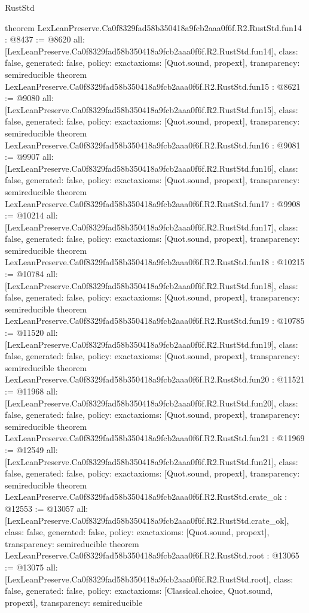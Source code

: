 \begin{lexlean}{RustStd}
\begin{coremodule}
{}
theorem LexLeanPreserve.Ca0f8329fad58b350418a9fcb2aaa0f6f.R2.RustStd.fun14 : @8437 := @8620 {
  all: [LexLeanPreserve.Ca0f8329fad58b350418a9fcb2aaa0f6f.R2.RustStd.fun14],
  class: false,
  generated: false,
  policy: exact{axioms: [Quot.sound, propext]},
  transparency: semireducible
}
theorem LexLeanPreserve.Ca0f8329fad58b350418a9fcb2aaa0f6f.R2.RustStd.fun15 : @8621 := @9080 {
  all: [LexLeanPreserve.Ca0f8329fad58b350418a9fcb2aaa0f6f.R2.RustStd.fun15],
  class: false,
  generated: false,
  policy: exact{axioms: [Quot.sound, propext]},
  transparency: semireducible
}
theorem LexLeanPreserve.Ca0f8329fad58b350418a9fcb2aaa0f6f.R2.RustStd.fun16 : @9081 := @9907 {
  all: [LexLeanPreserve.Ca0f8329fad58b350418a9fcb2aaa0f6f.R2.RustStd.fun16],
  class: false,
  generated: false,
  policy: exact{axioms: [Quot.sound, propext]},
  transparency: semireducible
}
theorem LexLeanPreserve.Ca0f8329fad58b350418a9fcb2aaa0f6f.R2.RustStd.fun17 : @9908 := @10214 {
  all: [LexLeanPreserve.Ca0f8329fad58b350418a9fcb2aaa0f6f.R2.RustStd.fun17],
  class: false,
  generated: false,
  policy: exact{axioms: [Quot.sound, propext]},
  transparency: semireducible
}
theorem LexLeanPreserve.Ca0f8329fad58b350418a9fcb2aaa0f6f.R2.RustStd.fun18 : @10215 := @10784 {
  all: [LexLeanPreserve.Ca0f8329fad58b350418a9fcb2aaa0f6f.R2.RustStd.fun18],
  class: false,
  generated: false,
  policy: exact{axioms: [Quot.sound, propext]},
  transparency: semireducible
}
theorem LexLeanPreserve.Ca0f8329fad58b350418a9fcb2aaa0f6f.R2.RustStd.fun19 : @10785 := @11520 {
  all: [LexLeanPreserve.Ca0f8329fad58b350418a9fcb2aaa0f6f.R2.RustStd.fun19],
  class: false,
  generated: false,
  policy: exact{axioms: [Quot.sound, propext]},
  transparency: semireducible
}
theorem LexLeanPreserve.Ca0f8329fad58b350418a9fcb2aaa0f6f.R2.RustStd.fun20 : @11521 := @11968 {
  all: [LexLeanPreserve.Ca0f8329fad58b350418a9fcb2aaa0f6f.R2.RustStd.fun20],
  class: false,
  generated: false,
  policy: exact{axioms: [Quot.sound, propext]},
  transparency: semireducible
}
theorem LexLeanPreserve.Ca0f8329fad58b350418a9fcb2aaa0f6f.R2.RustStd.fun21 : @11969 := @12549 {
  all: [LexLeanPreserve.Ca0f8329fad58b350418a9fcb2aaa0f6f.R2.RustStd.fun21],
  class: false,
  generated: false,
  policy: exact{axioms: [Quot.sound, propext]},
  transparency: semireducible
}
theorem LexLeanPreserve.Ca0f8329fad58b350418a9fcb2aaa0f6f.R2.RustStd.crate_ok : @12553 := @13057 {
  all: [LexLeanPreserve.Ca0f8329fad58b350418a9fcb2aaa0f6f.R2.RustStd.crate_ok],
  class: false,
  generated: false,
  policy: exact{axioms: [Quot.sound, propext]},
  transparency: semireducible
}
theorem LexLeanPreserve.Ca0f8329fad58b350418a9fcb2aaa0f6f.R2.RustStd.root : @13065 := @13075 {
  all: [LexLeanPreserve.Ca0f8329fad58b350418a9fcb2aaa0f6f.R2.RustStd.root],
  class: false,
  generated: false,
  policy: exact{axioms: [Classical.choice, Quot.sound, propext]},
  transparency: semireducible
}


\end{coremodule}
\end{lexlean}
